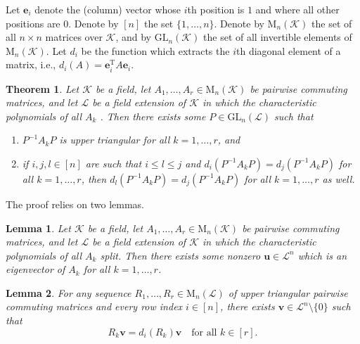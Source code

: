 \documentclass[12pt]{article}
\newtheorem*{theorem}{Theorem}
\newtheorem{lemma}{Lemma}
\newcommand{\mc}{\mathcal}
\newcommand{\vek}{\mathbf}
\newcommand{\Mat}{\mathrm{M}}
\newcommand{\GL}{\mathrm{GL}}
\newcommand{\Trans}[1]{#1^{\mathrm{T}}\!}
\begin{document}
Let $\vek{e}_i$ denote the (column) vector whose $i$th position is $1$ 
and where all other positions are $0$. Denote by $[n]$ the set 
$\{1,\dotsc,n\}$. Denote by $\Mat_n(\mc{K})$ the set of all $n \times 
n$ matrices over $\mc{K}$, and by $\GL_n(\mc{K})$ the set of all 
invertible elements of $\Mat_n(\mc{K})$. Let $d_i$ be the function 
which extracts the $i$th diagonal element of a matrix, i.e., \(d_i(A) 
= \Trans{\vek{e}_i} A \vek{e}_i\).


\begin{theorem}
  Let $\mc{K}$ be a field, let \(A_1,\dotsc,A_r \in \Mat_n(\mc{K})\) 
  be pairwise commuting matrices, and let $\mc{L}$ be a field extension 
  of $\mc{K}$ in which the characteristic polynomials of all $A_k$ 
  . Then there exists some 
  \(P \in \GL_n(\mc{L})\) such that
  \begin{enumerate}
    \item
      \(P^{-1} A_k P\) is upper triangular for all \(k=1,\dotsc,r\),
      and
    \item
      if \(i,j,l \in [n]\) are such that \(i \leqslant l \leqslant j\) 
      and \(d_i(P^{-1} A_k P) = d_j(P^{-1} A_k P)\) for all 
      \(k=1,\dotsc,r\), then \(d_l(P^{-1} A_k P) = d_j(P^{-1} A_k P)\) 
      for all \(k=1,\dotsc,r\) as well.
  \end{enumerate}
\end{theorem}

The proof relies on two lemmas.

\begin{lemma} \label{L1}
  Let $\mc{K}$ be a field, let \(A_1,\dotsc,A_r \in \Mat_n(\mc{K})\) 
  be pairwise commuting matrices, and let $\mc{L}$ be a field extension 
  of $\mc{K}$ in which the characteristic polynomials of all $A_k$ 
  split. Then there exists some nonzero \(\vek{u} \in \mc{L}^n\) which 
  is an eigenvector of $A_k$ for all \(k=1,\dotsc,r\).
\end{lemma}

\begin{lemma} \label{L2}
  For any sequence \(R_1,\dotsc,R_r \in \Mat_n(\mc{L})\) of upper 
  triangular pairwise commuting matrices and every row index 
  \(i \in [n]\), there exists \(\vek{v} \in \mc{L}^n \setminus \{0\}\) 
  such that
  \begin{equation*}
    R_k \vek{v} = d_i(R_k) \vek{v}
    \quad\text{for all \(k \in [r]\).}
  \end{equation*}
\end{lemma}
\end{document}
